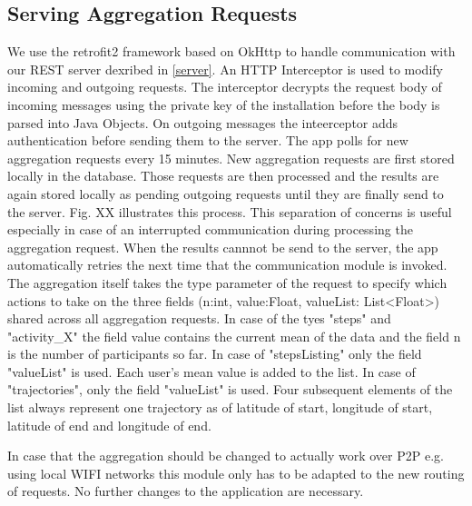 \subsection{Serving Aggregation Requests}
We use the retrofit2 framework \parencite{retrofit} based on OkHttp \parencite{okhttp} to handle communication with our REST server dexribed in \ref{server}. An HTTP Interceptor is used to modify incoming and outgoing requests. The interceptor decrypts the request body of incoming messages using the private key of the installation before the body is parsed into Java Objects. On outgoing messages the inteerceptor adds authentication before sending them to the server.
The app polls for new aggregation requests every 15 minutes. New aggregation requests are first stored locally in the database. Those requests are then processed and the results are again stored locally as pending outgoing requests until they are finally send to the server. Fig. XX illustrates this process. This separation of concerns is useful especially in case of an interrupted communication during processing the aggregation request. When the results cannnot be send to the server, the app automatically retries the next time that the communication module is invoked.
The aggregation itself takes the type parameter of the request to specify which actions to take on the three fields (n:int, value:Float, valueList: List<Float>) shared across all aggregation requests. In case of the tyes "steps" and "activity\_X" the field value contains the current mean of the data and the field n is the number of participants so far. In case of "stepsListing" only the field "valueList" is used. Each user's mean value is added to the list. In case of "trajectories", only the field "valueList" is used. Four subsequent elements of the list always represent one trajectory as of latitude of start, longitude of start, latitude of end and longitude of end.

In case that the aggregation should be changed to actually work over P2P e.g. using local WIFI networks this module only has to be adapted to the new routing of requests. No further changes to the application are necessary.


